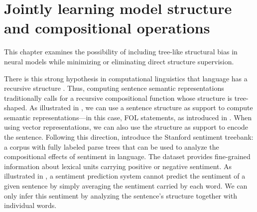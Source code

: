 \setchapterpreamble[u]{\margintoc}
\chapter{Jointly learning model structure and compositional operations}




This chapter examines the possibility of including tree-like structural bias in neural models while minimizing or eliminating direct structure supervision. 

There is this strong hypothesis in computational linguistics that language has a recursive structure \parencite{chomsky_56}. Thus, computing sentence semantic representations traditionally calls for a recursive compositional function whose structure is tree-shaped. As illustrated in , we can use a sentence structure as support to compute semantic representations—in this case, FOL statements, as introduced in . When using vector representations, we can also use the structure as support to encode the sentence. Following this direction, \textcite{socher_13} introduce the Stanford sentiment treebank: a corpus with fully labeled parse trees that can be used to analyze the compositional effects of sentiment in language. The dataset provides fine-grained information about lexical units carrying positive or negative sentiment. As illustrated in , a sentiment prediction system cannot predict the sentiment of a given sentence by simply averaging the sentiment carried by each word. We can only infer this sentiment by analyzing the sentence's structure together with individual words.

